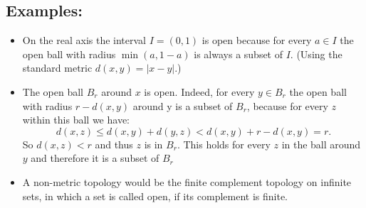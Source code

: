 \documentclass[12pt]{article}
\begin{document}
\subsection*{Examples:}
\begin{itemize}
\item On the real axis the interval $I=(0,1)$ is open because for every $a\in I$ the open ball with radius $\min(a,1-a)$ is always a subset of $I$. (Using the standard metric $d(x,y)=|x-y|$.)
\item The open ball $B_r$ around $x$ is open. Indeed, for every $y\in B_r$ the open ball with radius $r-d(x,y)$ around y is a subset of $B_r$, because for every $z$ within this ball we have: $$d(x,z)\leq d(x,y)+d(y,z)<d(x,y)+r-d(x,y)=r.$$
So $d(x,z)<r$ and thus $z$ is in $B_r$. This holds for every $z$ in the ball around $y$ and therefore it is a subset of $B_r$
\item A non-metric topology would be the finite complement topology on infinite sets, in which a set is called open, if its complement is finite.
\end{itemize}
\end{document}
